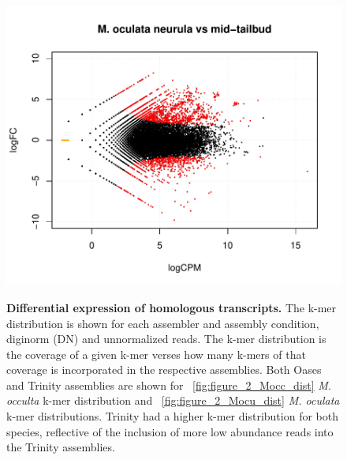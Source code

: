 \begin{figure}
{	\includegraphics[scale=0.5]{figures/mocu4v6_graph.pdf}
	}
	\caption{\textbf{Differential expression of homologous transcripts.} The k-mer distribution is shown for each assembler and assembly condition, diginorm (DN) and unnormalized reads. The k-mer distribution is the coverage of a given k-mer verses how many k-mers of that coverage is incorporated in the respective assemblies. Both Oases and Trinity assemblies are shown for ~\ref{fig:figure_2_Mocc_dist} \textit{M. occulta} k-mer distribution and  ~\ref{fig:figure_2_Mocu_dist} \textit{M. oculata} k-mer distributions. Trinity had a higher k-mer distribution for both species, reflective of the inclusion of more low abundance reads into the Trinity assemblies.}
	\label{fig:de_plots}
\end{figure}

